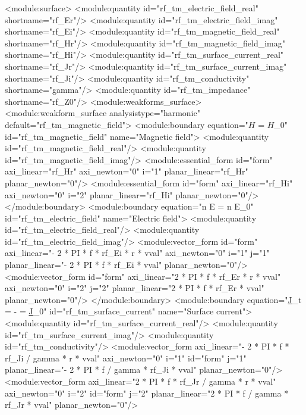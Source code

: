 \documentclass[12pt,a4paper,oneside]{article}
\numberwithin{equation}{section} %
\numberwithin{figure}{section} %
\numberwithin{table}{section} %
\newcommand{\faz}[1]{{\underline{#1}}} %
\newcommand{\vecfaz}[1]{\mbox{\underline{\boldmath$#1$}}} %
\begin{document}
\small\begin{spverbatim}
  <module:surface>
    <module:quantity id="rf_tm_electric_field_real" shortname="rf_Er"/>
    <module:quantity id="rf_tm_electric_field_imag" shortname="rf_Ei"/>
    <module:quantity id="rf_tm_magnetic_field_real" shortname="rf_Hr"/>
    <module:quantity id="rf_tm_magnetic_field_imag" shortname="rf_Hi"/>
    <module:quantity id="rf_tm_surface_current_real" shortname="rf_Jr"/>
    <module:quantity id="rf_tm_surface_current_imag" shortname="rf_Ji"/>
    <module:quantity id="rf_tm_conductivity" shortname="gamma"/>
    <module:quantity id="rf_tm_impedance" shortname="rf_Z0"/>
    <module:weakforms_surface>
      <module:weakform_surface analysistype="harmonic" default="rf_tm_magnetic_field">
        <module:boundary equation="\vecfaz{H} = \vecfaz{H}_0" id="rf_tm_magnetic_field" name="Magnetic field">
          <module:quantity id="rf_tm_magnetic_field_real"/>
          <module:quantity id="rf_tm_magnetic_field_imag"/>
          <module:essential_form id="form" axi_linear="rf_Hr" axi_newton="0" i="1" planar_linear="rf_Hr" planar_newton="0"/>
          <module:essential_form id="form" axi_linear="rf_Hi" axi_newton="0" i="2" planar_linear="rf_Hi" planar_newton="0"/>
        </module:boundary>
        <module:boundary equation="n \times E = n \times E_0" id="rf_tm_electric_field" name="Electric field">
          <module:quantity id="rf_tm_electric_field_real"/>
          <module:quantity id="rf_tm_electric_field_imag"/>
          <module:vector_form id="form" axi_linear="- 2 * PI * f * rf_Ei * r * vval" axi_newton="0" i="1" j="1" planar_linear="- 2 * PI * f * rf_Ei * vval" planar_newton="0"/>
          <module:vector_form id="form" axi_linear="2 * PI * f * rf_Er * r * vval" axi_newton="0" i="2" j="2" planar_linear="2 * PI * f * rf_Er * vval" planar_newton="0"/>
        </module:boundary>
        <module:boundary equation="\faz{J}_{t} = - \frac{\gamma}{\omega \varepsilon} \frac{\partial \vecfaz{H}}{\partial n_0} = \faz{J}_0" id="rf_tm_surface_current" name="Surface current">
          <module:quantity id="rf_tm_surface_current_real"/>
          <module:quantity id="rf_tm_surface_current_imag"/>
          <module:quantity id="rf_tm_conductivity"/>
          <module:vector_form axi_linear="- 2 * PI * f * rf_Ji / gamma * r * vval" axi_newton="0" i="1" id="form" j="1" planar_linear="- 2 * PI * f / gamma * rf_Ji * vval" planar_newton="0"/>
          <module:vector_form axi_linear="2 * PI * f * rf_Jr / gamma * r * vval" axi_newton="0" i="2" id="form" j="2" planar_linear="2 * PI * f / gamma * rf_Jr * vval" planar_newton="0"/>

\end{spverbatim}
\end{document}
